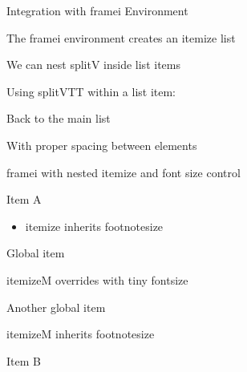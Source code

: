 \documentclass[11pt,compress,t,notes=noshow, xcolor=table]{beamer}
\begin{document}
\begin{framei}[fs=footnotesize,sep=M]{Integration with framei Environment}
  \item The framei environment creates an itemize list
  \item We can nest splitV inside list items
  
  \item Using splitVTT within a list item:
  
  \item Back to the main list
  \item With proper spacing between elements
\end{framei}


\begin{framei}[fs=footnotesize]{framei with nested itemize and font size control}
  \item Item A
  \begin{itemize}
    \item itemize inherits footnotesize
  \end{itemize}
  \item Global item
  \begin{itemizeM}[tiny]
    \item itemizeM overrides with tiny fontsize
  \end{itemizeM}
  \item Another global item
  \begin{itemizeM}
    \item itemizeM inherits footnotesize
  \end{itemizeM}
  \item Item B
\end{framei}

\end{document}
